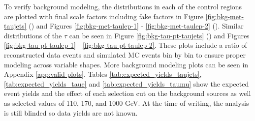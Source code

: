 		To verify background modeling, the \Etm distributions in each of the control regions are plotted with final scale factors including fake factors in Figure \ref{fig:bkg-met-taujets} (\taujets) and Figures \ref{fig:bkg-met-taulep-1} - \ref{fig:bkg-met-taulep-2} (\taulep). Similar distributions of the $\tau$ \pt can be seen in Figure \ref{fig:bkg-tau-pt-taujets} (\taujets) and Figures \ref{fig:bkg-tau-pt-taulep-1} - \ref{fig:bkg-tau-pt-taulep-2}. These plots include a ratio of reconstructed data events and simulated \gls{MC} events bin by bin to ensure proper modeling across variable shapes. More background modeling plots can be seen in Appendix \ref{app:valid-plots}. Tables \ref{tab:expected_yields_taujets}, \ref{tab:expected_yields_taue} and \ref{tab:expected_yields_taumu} show the expected event yields and the effect of each selection cut on the background sources as well as selected \mHpm values of 110, 170, and 1000 GeV. At the time of writing, the analysis is still blinded so data yields are not known.

